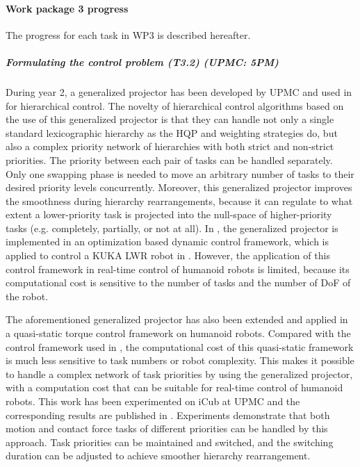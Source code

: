  
\paragraph{Work package 3 progress}

The progress for each task in WP3 is described hereafter.

\subparagraph*{Formulating the control problem (T3.2) (UPMC: 5PM)}

During year 2, a generalized projector has been developed by UPMC and used in \cite{liu-AutRob2015} for hierarchical control. The novelty of hierarchical control algorithms based on the use of this generalized projector is that they can handle not only a single standard lexicographic hierarchy as the HQP and weighting strategies do, but also a complex priority network of hierarchies with both strict and non-strict priorities. The priority between each pair of tasks can be handled separately. Only one swapping phase is needed to move an arbitrary number of tasks to their desired priority levels concurrently.  Moreover, this generalized projector improves the smoothness during hierarchy rearrangements, because it can regulate to what extent a lower-priority task is projected into the null-space of higher-priority tasks (e.g. completely, partially, or not at all). In \cite{liu-AutRob2015}, the generalized projector is implemented in an optimization based dynamic control framework, which is applied to control a KUKA LWR robot in \cite{liu_ICRA2015}. However, the application of this control framework in real-time control of humanoid robots is limited, because its computational cost is sensitive to the number of tasks and the number of DoF of the robot.

The aforementioned generalized projector has also been extended and applied in a quasi-static torque control framework on humanoid robots. Compared with the control framework used in \cite{liu-AutRob2015}, the computational cost of this quasi-static framework is much less sensitive to task numbers or robot complexity. This makes it possible to handle a complex network of task priorities by using the generalized projector, with a computation cost that can be suitable for real-time control of humanoid robots. This work has been experimented on iCub at UPMC and the corresponding results are published in \cite{liu-AutRobSI2015}. Experiments demonstrate that both motion and contact force tasks of different priorities can be handled by this approach. Task priorities can be maintained and switched, and the switching duration can be adjusted to achieve smoother hierarchy rearrangement.

